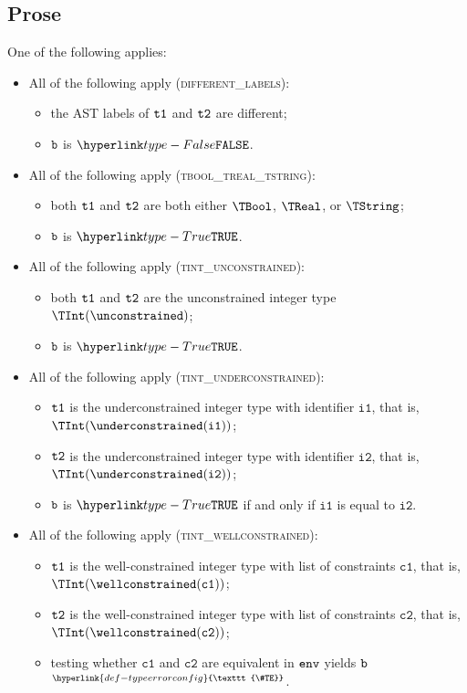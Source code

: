 \documentclass{book}
\newcommand\TypeErrorConfig[0]{\hyperlink{def-typeerrorconfig}{\texttt{\#TE}}}
\newcommand\ProseOrTypeError[0]{\hyperlink{def-proseortypeerror}{$^{\TypeErrorConfig}$}}
\newcommand\vcone[0]{\texttt{c1}}
\newcommand\vctwo[0]{\texttt{c2}}
\newcommand\vione[0]{\texttt{i1}}
\newcommand\vitwo[0]{\texttt{i2}}
\begin{document}
\subsection{Prose}
One of the following applies:
\begin{itemize}
  \item All of the following apply (\textsc{different\_labels}):
  \begin{itemize}
    \item the AST labels of $\texttt{t1}$ and $\texttt{t2}$ are different;
    \item $\texttt{b}$ is $\False$.
  \end{itemize}

  \item All of the following apply (\textsc{tbool\_treal\_tstring}):
  \begin{itemize}
    \item both $\texttt{t1}$ and $\texttt{t2}$ are both either $\TBool$, $\TReal$, or $\TString$;
    \item $\texttt{b}$ is $\True$.
  \end{itemize}

  \item All of the following apply (\textsc{tint\_unconstrained}):
  \begin{itemize}
    \item both $\texttt{t1}$ and $\texttt{t2}$ are the unconstrained integer type $\TInt(\unconstrained)$;
    \item $\texttt{b}$ is $\True$.
  \end{itemize}

  \item All of the following apply (\textsc{tint\_underconstrained}):
  \begin{itemize}
    \item $\texttt{t1}$ is the underconstrained integer type with identifier $\vione$, that is, \\ $\TInt(\underconstrained(\vione))$;
    \item $\texttt{t2}$ is the underconstrained integer type with identifier $\vitwo$, that is, \\ $\TInt(\underconstrained(\vitwo))$;
    \item $\texttt{b}$ is $\True$ if and only if $\vione$ is equal to $\vitwo$.
  \end{itemize}

  \item All of the following apply (\textsc{tint\_wellconstrained}):
  \begin{itemize}
    \item $\texttt{t1}$ is the well-constrained integer type with list of constraints $\vcone$, that is, \\ $\TInt(\wellconstrained(\vcone))$;
    \item $\texttt{t2}$ is the well-constrained integer type with list of constraints $\vctwo$, that is, \\ $\TInt(\wellconstrained(\vctwo))$;
    \item testing whether $\vcone$ and $\vctwo$ are equivalent in $\texttt{env}$ yields $\texttt{b}$ \ProseOrTypeError.
  \end{itemize}


\end{itemize}
\end{document}
